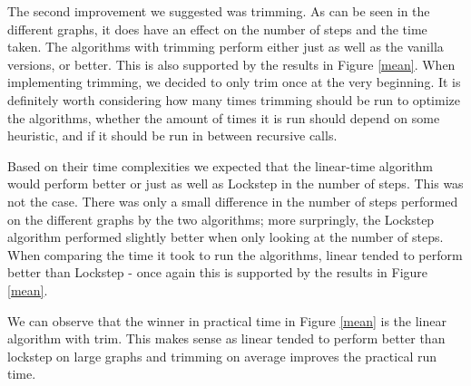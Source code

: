 \documentclass[../master/master.tex]{subfiles}
\begin{document}
The second improvement we suggested was trimming. As can be seen in the different graphs, it does have an effect on the number of steps and the time taken. The algorithms with trimming perform either just as well as the vanilla versions, or better. This is also supported by the results in Figure \ref{mean}. When implementing trimming, we decided to only trim once at the very beginning. It is definitely worth considering how many times trimming should be run to optimize the algorithms, whether the amount of times it is run should depend on some heuristic, and if it should be run in between recursive calls.

Based on their time complexities we expected that the linear-time algorithm would perform better or just as well as Lockstep in the number of steps. This was not the case. There was only a small difference in the number of steps performed on the different graphs by the two algorithms; more surpringly, the Lockstep algorithm performed slightly better when only looking at the number of steps. When comparing the time it took to run the algorithms, linear tended to perform better than Lockstep - once again this is supported by the results in Figure \ref{mean}.

We can observe that the winner in practical time in Figure \ref{mean} is the linear algorithm with trim. This makes sense as linear tended to perform better than lockstep on large graphs and trimming on average improves the practical run time.
\end{document}
